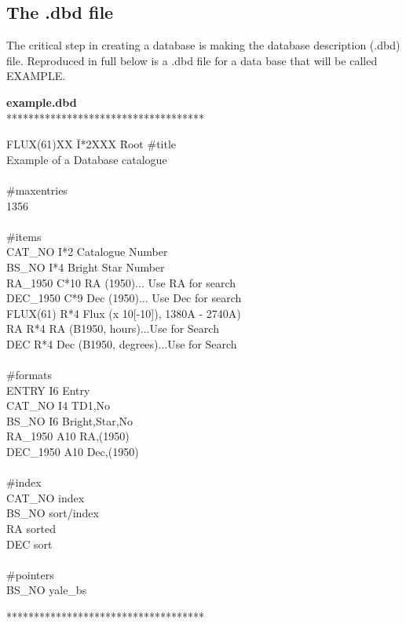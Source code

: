 \subsection{The .dbd file}
The critical step in creating a database is making the database description
(.dbd) file.  Reproduced in full below is a .dbd file for a data base that will
be called EXAMPLE.
\begin{center}
{\bf example.dbd} \\
************************************
\end{center}
\begin{tabbing}
FLUX(61)XX \= I*2XXX \= Root   \kill
\#title     \\
Example of a Database catalogue \\
\>  \>  \\ 
\#maxentries   \\
1356            \\
\>  \>  \\ 
\#items       \\
CAT\_NO    \>   I*2  \>   Catalogue Number  \\
BS\_NO     \>   I*4  \>   Bright Star Number \\
RA\_1950   \>   C*10 \>   RA (1950)... Use RA for search  \\
DEC\_1950  \>   C*9  \>   Dec (1950)... Use Dec for search  \\
FLUX(61)   \>   R*4  \>   Flux (x 10[-10]), 1380A - 2740A) \\
RA         \>   R*4  \>   RA (B1950, hours)...Use for Search          \\
DEC        \>   R*4  \>   Dec (B1950, degrees)...Use for Search       \\
 \> \> \\
\#formats       \\
ENTRY       \>   I6   \>   Entry               \\
CAT\_NO     \>   I4   \>   TD1,No             \\
BS\_NO      \>   I6   \>   Bright,Star,No    \\
RA\_1950    \>   A10  \>   RA,(1950)          \\
DEC\_1950   \>   A10  \>   Dec,(1950)         \\
 \> \> \\
\#index  \\
CAT\_NO    \>     index  \\
BS\_NO     \>     sort/index       \\
RA         \>     sorted      \\
DEC        \>     sort        \\
 \> \> \\
\#pointers                  \\
BS\_NO     \>      yale\_bs    \\ 
\end{tabbing}
\begin{center}
************************************
\end{center}


